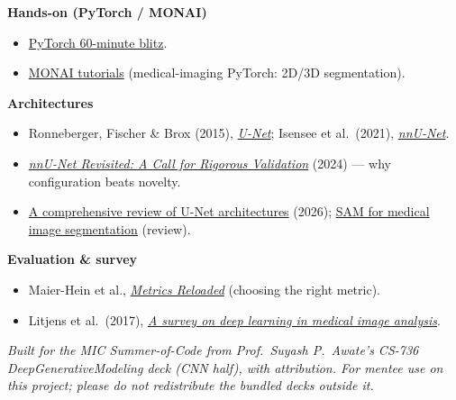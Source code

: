\documentclass[11pt]{article}
\begin{document}
\textbf{Hands-on (PyTorch / MONAI)}
\begin{itemize}[nosep,leftmargin=*]
  \item \href{https://pytorch.org/tutorials/beginner/deep_learning_60min_blitz.html}{PyTorch 60-minute blitz}.
  \item \href{https://github.com/Project-MONAI/tutorials}{MONAI tutorials} (medical-imaging PyTorch: 2D/3D segmentation).
\end{itemize}

\textbf{Architectures}
\begin{itemize}[nosep,leftmargin=*]
  \item Ronneberger, Fischer \& Brox (2015), \href{https://arxiv.org/abs/1505.04597}{\emph{U-Net}}; Isensee et al.\ (2021), \href{https://www.nature.com/articles/s41592-020-01008-z}{\emph{nnU-Net}}.
  \item \href{https://arxiv.org/html/2404.09556v2}{\emph{nnU-Net Revisited: A Call for Rigorous Validation}} (2024) --- why configuration beats novelty.
  \item \href{https://link.springer.com/article/10.1007/s00521-026-12198-6}{A comprehensive review of U-Net architectures} (2026); \href{https://www.mdpi.com/2306-5354/12/12/1312}{SAM for medical image segmentation} (review).
\end{itemize}

\textbf{Evaluation \& survey}
\begin{itemize}[nosep,leftmargin=*]
  \item Maier-Hein et al., \href{https://www.nature.com/articles/s41592-023-02151-z}{\emph{Metrics Reloaded}} (choosing the right metric).
  \item Litjens et al.\ (2017), \href{https://www.sciencedirect.com/science/article/pii/S1361841517301135}{\emph{A survey on deep learning in medical image analysis}}.
\end{itemize}

\vfill
\begin{center}\small\itshape
Built for the MIC Summer-of-Code from Prof.\ Suyash P.\ Awate's CS-736
DeepGenerativeModeling deck (CNN half), with attribution. For mentee use on this
project; please do not redistribute the bundled decks outside it.
\end{center}
\end{document}
